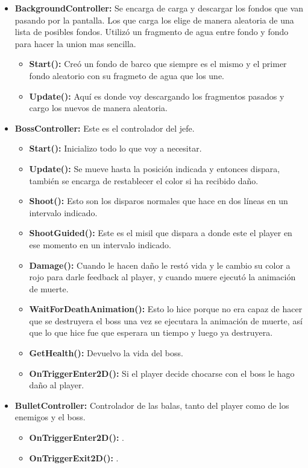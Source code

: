 \documentclass[titlepage, 4apaper]{article}
\begin{document}
\begin{itemize}
	\item \textbf{BackgroundController:} Se encarga de carga y descargar los fondos que van pasando por la pantalla. Los que carga los elige de manera aleatoria de una lista de posibles fondos. Utilizó un fragmento de agua entre fondo y fondo para hacer la union mas sencilla.
  \begin{itemize}
    \item \textbf{Start():} Creó un fondo de barco que siempre es el mismo y el primer fondo aleatorio con su fragmeto de agua que los une.
    \item \textbf{Update():} Aquí es donde voy descargando los fragmentos pasados y cargo los nuevos de manera aleatoria.
    \end{itemize}

  \item \textbf{BossController:} Este es el controlador del jefe.
  \begin{itemize}
    \item \textbf{Start():} Inicializo todo lo que voy a necesitar.
    \item \textbf{Update():} Se mueve hasta la posición indicada y entonces dispara, también se encarga de restablecer el color si ha recibido daño.
    \item \textbf{Shoot():} Esto son los disparos normales que hace en dos líneas en un intervalo indicado.
    \item \textbf{ShootGuided():} Este es el misil que dispara a donde este el player en ese momento en un intervalo indicado.
    \item \textbf{Damage():} Cuando le hacen daño le restó vida y le cambio su color a rojo para darle feedback al player, y cuando muere ejecutó la animación de muerte.
    \item \textbf{WaitForDeathAnimation():} Esto lo hice porque no era capaz de hacer que se destruyera el boss una vez se ejecutara la animación de muerte, así que lo que hice fue que esperara un tiempo y luego ya destruyera.
    \item \textbf{GetHealth():} Devuelvo la vida del boss.
    \item \textbf{OnTriggerEnter2D():} Si el player decide chocarse con el boss le hago daño al player.
  \end{itemize}

  \item \textbf{BulletController:} Controlador de las balas, tanto del player como de los enemigos y el boss.
  \begin{itemize}
    \item \textbf{OnTriggerEnter2D():} .
    \item \textbf{OnTriggerExit2D():} .
  \end{itemize}


\end{itemize}
\end{document}
